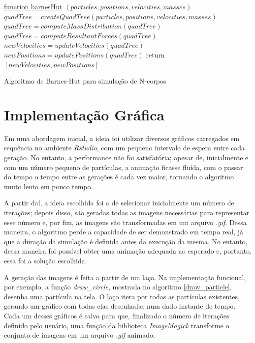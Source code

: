 \documentclass[rel_mlp]{iiufrgs}
\begin{document}
\begin{algorithm}
	\label{barnesHutAlgorithm}

    \underline{function barnesHut} $(particles, positions, velocities, masses)$\;
    $quadTree = createQuadTree(particles, positions, velocities, masses)$\;
    $quadTree = computeMassDistribution(quadTree)$\;
    $quadTree = computeResultantForces(quadTree)$\;
    $newVelocities = updateVelocities(quadTree)$\;
    $newPositions = updatePositions(quadTree)$\;
    return $[newVelocities, newPositions]$\;
    \caption{Algoritmo de Barnes-Hut para simulação de N-corpos}
\end{algorithm}

\section{Implementação Gráfica}

    Em uma abordagem inicial, a ideia foi utilizar diversos gráficos carregados em sequência no
    ambiente \textit{Rstudio}, com um pequeno intervalo de espera entre cada geração.
    No entanto, a performance não foi satisfatória; apesar de, inicialmente e com um número
    pequeno de partículas, a animação ficasse fluída, com o passar do tempo o tempo
    entre as gerações é cada vez maior, tornando o algoritmo muito lento em pouco tempo.

    A partir daí, a ideia escolhida foi a de selecionar inicialmente um número de iterações; depois disso, são geradas todas as imagens necessárias para representar esse número e, por fim, as imagens são transformadas em um arquivo \textit{.gif}. Dessa maneira, o algoritmo perde a capacidade de ser demonstrado em tempo real, já que a duração da simulação é definida antes da execução da mesma. No entanto, dessa maneira foi possível obter uma animação adequada ao esperado e, portanto, essa foi a solução escolhida.

    A geração das imagens é feita a partir de um laço. Na implementação funcional, por exemplo,
    a função \textit{draw{\_}circle}, mostrada no algoritmo \ref{draw_particle}, desenha uma partícula na tela.
    O laço itera por todas as partículas existentes, gerando um gráfico com todas elas desenhadas num
    dado instante de tempo. Cada um desses gráficos é salvo para que, finalizado o número de iterações
    definido pelo usuário, uma função da biblioteca \textit{ImageMagick} transforme o conjunto de imagens
    em um arquivo \textit{.gif} animado.
\end{document}
